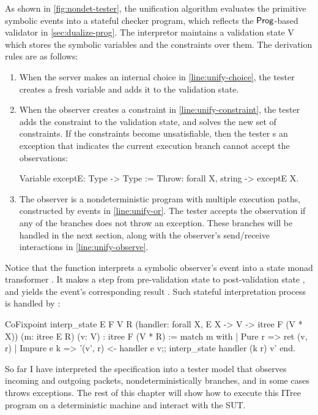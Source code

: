 As shown in \autoref{fig:nondet-tester}, the unification algorithm evaluates the
primitive symbolic events into a stateful checker program, which reflects the
$\mathsf{Prog}$-based validator in \autoref{sec:dualize-prog}.  The interpretor
maintains a validation state \ilc V which stores the symbolic variables and the
constraints over them.  The derivation rules are as follows:
\begin{enumerate}
  \item When the server makes an internal choice in \autoref{line:unify-choice},
    the tester creates a fresh variable and adds it to the validation state.
  \item When the observer creates a constraint in
    \autoref{line:unify-constraint}, the tester adds the constraint to the
    validation state, and solves the new set of constraints.  If the constraints
    become unsatisfiable, then the tester s an exception that
    indicates the current execution branch cannot accept the observations:
\begin{coq}
  Variable exceptE: Type -> Type :=
    Throw: forall {X}, string -> exceptE X.
\end{coq}      
  \item The observer is a nondeterministic program with multiple execution
    paths, constructed by  events in \autoref{line:unify-or}.  The
    tester accepts the observation if any of the branches does not throw an
    exception.  These branches will be handled in the next section, along with
    the observer's send/receive interactions in \autoref{line:unify-observe}.
\end{enumerate}

Notice that the  function interprets a symbolic observer's event
 into a state monad transformer .  It
makes a step from pre-validation state  to post-validation state
, and yields the event's corresponding result .  Such
stateful interpretation process is handled by :
\begin{coq}
  CoFixpoint interp_state {E F V R}
                          (handler: forall {X}, E X -> V -> itree F (V * X))
                          (m: itree E R) (v: V)
             : itree F (V * R) :=
    match m with
    | Pure   r   => ret (v, r)
    | Impure e k => '(v', r) <- handler e v;;
                    interp_state handler (k r) v'
    end.
\end{coq}

So far I have interpreted the specification into a tester model that observes
incoming and outgoing packets, nondeterministically branches, and in some cases
throws exceptions.  The rest of this chapter will show how to execute this ITree
program on a deterministic machine and interact with the SUT.
